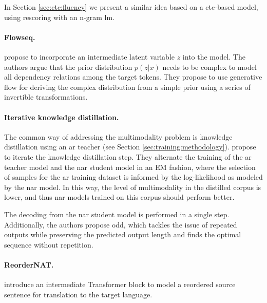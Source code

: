 In Section \ref{sec:ctc:fluency} we present a similar idea based on a
\ac{ctc}-based model, using rescoring with an n-gram \acl{lm}.

\paragraph{Flowseq.} %
\citet{ma-etal-2019-flowseq} propose to incorporate an intermediate latent
variable $z$ into the model. The authors argue that the prior distribution
$p(z|x)$ needs to be complex to model all dependency relations among the target
tokens. They propose to use generative flow \citep{rezende2015variational} for
deriving the complex distribution from a simple prior using a series of
invertible transformations. %

\paragraph{Iterative knowledge distillation.}
The common way of addressing the multimodality problem is knowledge
distillation using an \acl{ar} teacher (see Section
\ref{sec:training:methodology}).  \citet{sun2020em} propose to iterate the
knowledge distillation step. They alternate the training of the \ac{ar} teacher
model and the \ac{nar} student model in an EM fashion, where the selection of
samples for the \ac{ar} training dataset is informed by the log-likelihood as
modeled by the \ac{nar} model. In this way, the level of multimodality in the
distilled corpus is lower, and thus \ac{nar} models trained on this corpus
should perform better.

The decoding from the \ac{nar} student model is performed in a single step.
Additionally, the authors propose \acf{odd}, which tackles the issue of
repeated outputs while preserving the predicted output length and finds the
optimal sequence without repetition.

\paragraph{ReorderNAT.} \citet{ran-etal-2021-guiding} introduce an intermediate
Transformer block to model a reordered source sentence for translation to the
target language.

